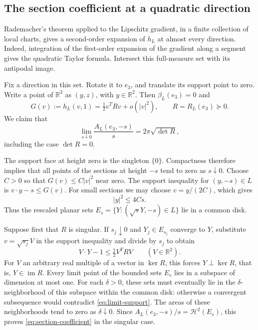\documentclass[11pt,a4paper]{article}
\theoremstyle{definition}
\theoremstyle{remark}
\newcommand{\R}{\mathbb R}
\newcommand{\area}{\mathcal H^2}
\numberwithin{equation}{section}
\begin{document}
\subsection{The section coefficient at a quadratic direction}\label{app:sections}
Rademacher's theorem applied to the Lipschitz gradient, in a finite
collection of local charts, gives a second-order expansion of $h_L$
at almost every direction. Indeed, integration of the first-order
expansion of the gradient along a segment gives the quadratic Taylor
formula. Intersect this full-measure set with its antipodal image.

Fix a direction in this set. Rotate it to $e_3$, and translate its
support point to zero. Write a point of $\R^3$ as $(y,z)$, with
$y\in\R^2$. Then $\beta_L(e_3)=0$ and
\begin{equation}\label{eq:G-expansion}
 G(v):=h_L(v,1)=\tfrac12v^TRv+o(|v|^2),\qquad
 R=R_L(e_3)\succeq0 .
\end{equation}
We claim that
\begin{equation}\label{eq:section-coefficient}
 \lim_{s\downarrow0}\frac{A_L(e_3,-s)}s
   =2\pi\sqrt{\det R},
\end{equation}
including the case $\det R=0$.

The support face at height zero is the singleton $\{0\}$. Compactness
therefore implies that all points of the sections at height $-s$
tend to zero as $s\downarrow0$. Choose $C>0$ so that
$G(v)\le C|v|^2$ near zero. The support inequality for $(y,-s)\in L$ is
$v\cdot y-s\le G(v)$. For small sections we may choose $v=y/(2C)$,
which gives
\begin{equation}\label{eq:section-bound}
 |y|^2\le4Cs.
\end{equation}
Thus the rescaled planar sets
$E_s=\{Y:(\sqrt{s}Y,-s)\in L\}$ lie in a common disk.

Suppose first that $R$ is singular. If $s_j\downarrow0$ and
$Y_j\in E_{s_j}$ converge to $Y$, substitute $v=\sqrt{s_j}V$
in the support inequality and divide by $s_j$ to obtain
\begin{equation}\label{eq:limit-support}
 V\cdot Y-1\le\tfrac12 V^TRV\qquad(V\in\R^2).
\end{equation}
For $V$ an arbitrary real multiple of a vector in $\ker R$, this forces
$Y\perp\ker R$, that is, $Y\in\operatorname{im}R$.
Every limit point of the bounded sets $E_s$ lies in a subspace of
dimension at most one. For each $\delta>0$, these sets must eventually
lie in the $\delta$-neighborhood of this subspace within the common
disk: otherwise a convergent subsequence would contradict
\eqref{eq:limit-support}. The areas of these neighborhoods tend to zero
as $\delta\downarrow0$. Since $A_L(e_3,-s)/s=\area(E_s)$, this proves
\eqref{eq:section-coefficient} in the singular case.
\end{document}
